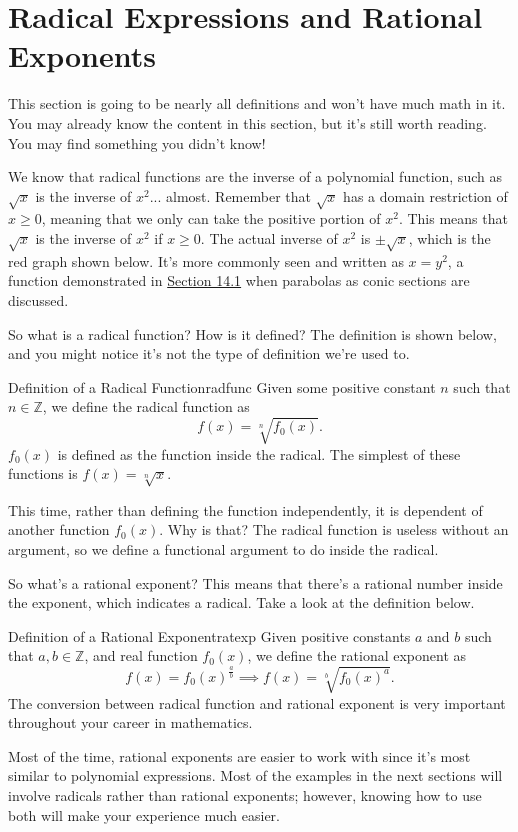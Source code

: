 \documentclass[lang=en,11pt]{elegantbook}
\begin{document}
\section{Radical Expressions and Rational Exponents}
\noindent This section is going to be nearly all definitions and won't have much math in it.  You may already know the content in this section, but it's still worth reading. You may find something you didn't know!

We know that radical functions are the inverse of a polynomial function, such as $\sqrt{x}$ is the inverse of $x^2$... almost.  Remember that $\sqrt{x}$ has a domain restriction of $x\geq 0$, meaning that we only can take the positive portion of $x^2$.  This means that $\sqrt{x}$ is the inverse of $x^2$ if $x\geq 0$.  The actual inverse of $x^2$ is $\pm\sqrt{x}$, which is the red graph shown below.  It's more commonly seen and written as $x=y^2$, a function demonstrated in \hyperlink{section.14.1}{Section 14.1} when parabolas as conic sections are discussed.

So what is a radical function?  How is it defined? The definition is shown below, and you might notice it's not the type of definition we're used to.
\begin{definition}{Definition of a Radical Function}{radfunc}
Given some positive constant $n$ such that $n\in\mathbb{Z}$, we define the radical function as $$f(x)=\sqrt[n]{f_0(x)}.$$ $f_0(x)$ is defined as the function inside the radical. The simplest of these functions is $f(x)=\sqrt[n]{x}$.
\end{definition}
This time, rather than defining the function independently, it is dependent of another function $f_0(x)$.  Why is that? The radical function is useless without an argument, so we define a functional argument to do inside the radical.

So what's a rational exponent?  This means that there's a rational number inside the exponent, which indicates a radical.  Take a look at the definition below.

\begin{definition}{Definition of a Rational Exponent}{ratexp}
Given positive constants $a$ and $b$ such that $a,b\in\mathbb{Z}$, and real function $f_0(x)$, we define the rational exponent as $$f(x)=f_0(x)^{\frac{a}{b}} \implies f(x)=\sqrt[b]{f_0(x)^a}.$$ The conversion between radical function and rational exponent is very important throughout your career in mathematics.
\end{definition}
Most of the time, rational exponents are easier to work with since it's most similar to polynomial expressions. Most of the examples in the next sections will involve radicals rather than rational exponents; however, knowing how to use both will make your experience much easier.
\end{document}
